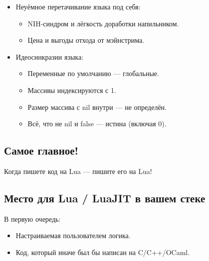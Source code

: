 \documentclass[aspectratio=169,handout,bigger]{beamer}
\begin{document}
\begin{frame}
  \begin{itemize}
    \item Неуёмное перетачивание языка под себя:
    \begin{itemize}
      \item NIH-синдром и лёгкость доработки напильником.
      \item Цена и выгоды отхода от мэйнстрима.
    \end{itemize}
    \item Идеосинкразии языка:
    \begin{itemize}
      \item Переменные по умолчанию — глобальные.
      \item Массивы индексируются с 1.
      \item Размер массива с nil внутри — не определён.
      \item Всё, что не nil и false — истина (включая 0).
    \end{itemize}
  \end{itemize}
\end{frame}


\subsection*{Самое главное!}

\begin{frame}
  \centering Когда пишете код на Lua — пишите его на Lua!
\end{frame}


\subsection*{Место для Lua / LuaJIT в вашем стеке}

\begin{frame}
  В первую очередь:

  \begin{itemize}
    \item Настраиваемая пользователем логика.
    \item Код, который иначе был бы написан на C/C++/OCaml.
  \end{itemize}
\end{frame}
\end{document}
